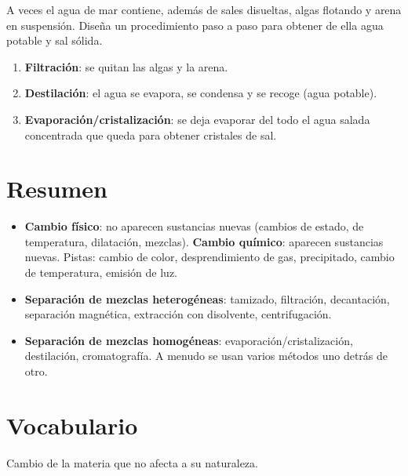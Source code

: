 \begin{exercise}
    A veces el agua de mar contiene, además de sales disueltas, algas flotando y arena en suspensión. Diseña un procedimiento paso a paso para obtener de ella agua potable y sal sólida.
    \begin{solu}
        \begin{enumerate}
            \item \textbf{Filtración}: se quitan las algas y la arena.
            \item \textbf{Destilación}: el agua se evapora, se condensa y se recoge (agua potable).
            \item \textbf{Evaporación/cristalización}: se deja evaporar del todo el agua salada concentrada que queda para obtener cristales de sal.
        \end{enumerate}
    \end{solu}
\end{exercise}


\section*{Resumen}

\begin{itemize}
    \item \textbf{Cambio físico}: no aparecen sustancias nuevas (cambios de estado, de temperatura, dilatación, mezclas). \textbf{Cambio químico}: aparecen sustancias nuevas. Pistas: cambio de color, desprendimiento de gas, precipitado, cambio de temperatura, emisión de luz.
    \item \textbf{Separación de mezclas heterogéneas}: tamizado, filtración, decantación, separación magnética, extracción con disolvente, centrifugación.
    \item \textbf{Separación de mezclas homogéneas}: evaporación/cristalización, destilación, cromatografía. A menudo se usan varios métodos uno detrás de otro.
\end{itemize}

\section{Vocabulario}

\begin{vocabulary}
    Cambio de la materia que no afecta a su naturaleza.
\end{vocabulary}

